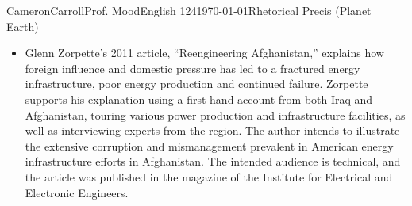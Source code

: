 \documentclass[11pt,letterpaper]{article}
\begin{document}
\newpage
\thispagestyle{empty}

\begin{mla}{Cameron}{Carroll}{Prof. Mood}{English 124}{\today}{Rhetorical Precis (Planet Earth)}
\begin{itemize}
\item Glenn Zorpette's 2011 article, ``Reengineering Afghanistan,'' explains how foreign influence and domestic pressure has led to a fractured energy infrastructure, poor energy production and continued failure. Zorpette supports his explanation using a first-hand account from both Iraq and Afghanistan, touring various power production and infrastructure facilities, as well as interviewing experts from the region. The author intends to illustrate the extensive corruption and mismanagement prevalent in American energy infrastructure efforts in Afghanistan. The intended audience is technical, and the article was published in the magazine of the Institute for Electrical and Electronic Engineers. 
\end{itemize}
\end{mla}
\end{document}
